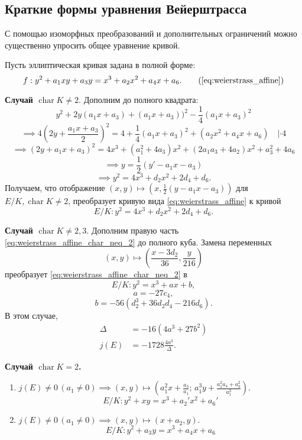 \documentclass[12pt]{article}
\theoremstyle{definition}
\theoremstyle{definition}
\theoremstyle{definition}
\begin{document}
\subsection{Краткие формы уравнения Вейерштрасса}
С помощью изоморфных преобразований и дополнительных ограничений можно существенно упросить общее уравнение кривой.

Пусть эллиптическая кривая задана в полной форме:
\begin{equation*}
f: y^2+a_1xy + a_3y = x^3 + a_2x^2 + a_4x + a_6. \tag{\ref{eq:weierstrass_affine}}
\end{equation*}

\textbf{Случай $\operatorname{char}{K} \neq 2$}.
Дополним до полного квадрата:
\[
y^2 + 2y(a_1x+a_3)+(a_1x+a_3))^2- \frac{1}{4}(a_1x+a_3)^2
\]
\[
\implies 4(2y + \frac{a_1x+a_3}{2})^2 = 4 + \frac{1}{4}(a_1x+a_3)^2 + (a_2x^2 + a_4x + a_6) \quad| \cdot 4
\]
\[
\implies (2y + a_1x+a_3)^2 = 4x^3 + (a_1^2 + 4a_3)x^2 + (2a_1a_3 + 4a_2)x^2 + a_3^2 + 4a_6
\]
\[
\implies y = \frac{1}{2}(y' - a_1x - a_3)
\]
\[
\implies y^2 = 4x^3 + d_2x^2 + 2d_4 + d_6.
\]
Получаем, что отображение $(x, y)\mapsto(x, \frac{1}{2}(y-a_1x-a_3))$ для $E/K, \operatorname{char}{K} \neq 2$, преобразует кривую вида \eqref{eq:weierstrass_affine} к кривой
\begin{equation}
\label{eq:weierstrass_affine_char_neq_2}
E/K: y^2 = 4x^3 + d_2x^2 + 2d_4 + d_6.
\end{equation}

\textbf{Случай $\operatorname{char}{K} \neq 2, 3$}. 
Дополним правую часть \eqref{eq:weierstrass_affine_char_neq_2} до полного куба. Замена переменных
\[
(x, y) \mapsto \left(\frac{x-3d_2}{36}, \frac{y}{216}\right)
\]
преобразует \eqref{eq:weierstrass_affine_char_neq_2} в 
\begin{equation}
\label{eq:weierstrass_affine_char_neq_2_3}
E/K: y^2 = x^3 + ax + b,
\end{equation}
\[
a = -27c_4,
\]
\[
b = -56(d_2^3 + 36d_2d_4 - 216d_6). 
\]
В этом случае, 
\begin{align*}
\Delta &= -16(4a^3 + 27b^2) \\ \nonumber
j(E) &= -1728 \frac{4a^3}{\Delta}. \nonumber
\end{align*}

\textbf{Случай $\operatorname{char}{K} = 2$.} 
\begin{enumerate}
	\item $
	j(E)\neq0 \, (a_1\neq0) \implies (x, y) \mapsto (a_1^2x+\frac{a_3}{a_1}; \, a_1^3y + \frac{a_1^2a_4+a_3^2}{a_1^3}).
	$
	\begin{equation}
	\label{eq:weierstrass_affine_char_2_case_1}
	E/K: y^2+xy=x^3+a_2'x^2+a_6'
	\end{equation}
	\item $
	j(E)\neq0 \, (a_1\neq0) \implies (x, y) \mapsto (x+a_2, y).
	$
	\begin{equation}
	\label{eq:weierstrass_affine_char_2_case_2}
	E/K: y^2+a_3y = x^3+a_4x+a_6
	\end{equation}
\end{enumerate}
\end{document}
